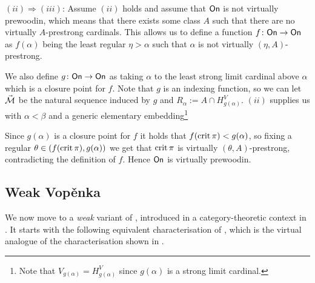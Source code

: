 \documentclass[../../main]{subfiles}
\begin{document}
{  

  \qquad $(ii)\Rightarrow(iii)$: Assume $(ii)$ holds and assume that $\textsf{On}$ is not virtually prewoodin, which means that there exists some class $A$ such that there are no virtually $A$-prestrong cardinals. This allows us to define a function $f\colon\textsf{On}\to\textsf{On}$ as $f(\alpha)$ being the least regular $\eta>\alpha$ such that $\alpha$ is not virtually $(\eta,A)$-prestrong.

  \qquad We also define $g\colon\textsf{On}\to\textsf{On}$ as taking $\alpha$ to the least strong limit cardinal above $\alpha$ which is a closure point for $f$. Note that $g$ is an indexing function, so we can let $\vec{\operatorname{\mathcal M}}$ be the natural sequence induced by $g$ and $R_\alpha := A\cap H_{g(\alpha)}^V$. $(ii)$ supplies us with $\alpha<\beta$ and a generic elementary embedding\footnote{Note that $V_{g(\alpha)}=H_{g(\alpha)}^V$ since $g(\alpha)$ is a strong limit cardinal.}

  Since $g(\alpha)$ is a closure point for $f$ it holds that $f(\operatorname{crit}\pi)<g(\alpha)$, so fixing a regular $\theta\in(f(\operatorname{crit}\pi), g(\alpha))$ we get that $\operatorname{crit}\pi$ is virtually $(\theta, A)$-prestrong, contradicting the definition of $f$. Hence $\textsf{On}$ is virtually prewoodin.
}


\subsection{Weak Vop\v enka}


We now move to a \textit{weak} variant of \gvp, introduced in a category-theoretic context in \cite{AdamekRosicky}. It starts with the following equivalent characterisation of \gvp, which is the virtual analogue of the characterisation shown in \cite{AdamekRosicky}.
\end{document}
